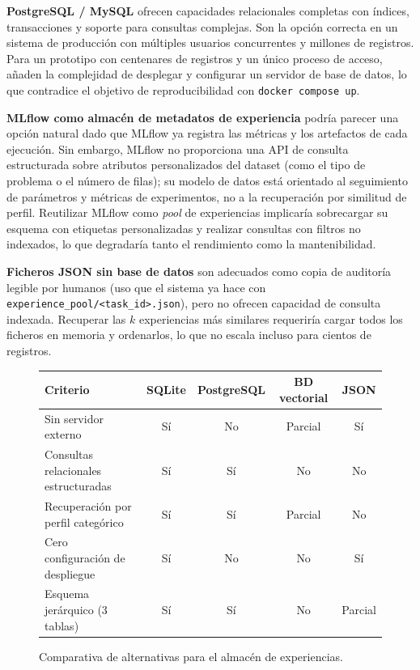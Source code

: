 \textbf{PostgreSQL / MySQL} ofrecen capacidades relacionales completas con índices, transacciones y soporte para consultas complejas. Son la opción correcta en un sistema de producción con múltiples usuarios concurrentes y millones de registros. Para un prototipo con centenares de registros y un único proceso de acceso, añaden la complejidad de desplegar y configurar un servidor de base de datos, lo que contradice el objetivo de reproducibilidad con \texttt{docker compose up}.

\textbf{MLflow como almacén de metadatos de experiencia} podría parecer una opción natural dado que MLflow ya registra las métricas y los artefactos de cada ejecución. Sin embargo, MLflow no proporciona una API de consulta estructurada sobre atributos personalizados del dataset (como el tipo de problema o el número de filas); su modelo de datos está orientado al seguimiento de parámetros y métricas de experimentos, no a la recuperación por similitud de perfil. Reutilizar MLflow como \emph{pool} de experiencias implicaría sobrecargar su esquema con etiquetas personalizadas y realizar consultas con filtros no indexados, lo que degradaría tanto el rendimiento como la mantenibilidad.

\textbf{Ficheros JSON sin base de datos} son adecuados como copia de auditoría legible por humanos (uso que el sistema ya hace con \texttt{experience\_pool/<task\_id>.json}), pero no ofrecen capacidad de consulta indexada. Recuperar las $k$ experiencias más similares requeriría cargar todos los ficheros en memoria y ordenarlos, lo que no escala incluso para cientos de registros.

\begin{figure}[H]
\centering
\begin{tabular}{lcccc}
\hline
\textbf{Criterio} & \textbf{SQLite} & \textbf{PostgreSQL} & \textbf{BD vectorial} & \textbf{JSON} \\
\hline
Sin servidor externo & Sí & No & Parcial & Sí \\
Consultas relacionales estructuradas & Sí & Sí & No & No \\
Recuperación por perfil categórico & Sí & Sí & Parcial & No \\
Cero configuración de despliegue & Sí & No & No & Sí \\
Esquema jerárquico (3 tablas) & Sí & Sí & No & Parcial \\
\hline
\end{tabular}
\caption{Comparativa de alternativas para el almacén de experiencias.}
\label{tab:alt-experiencia}
\end{figure}

